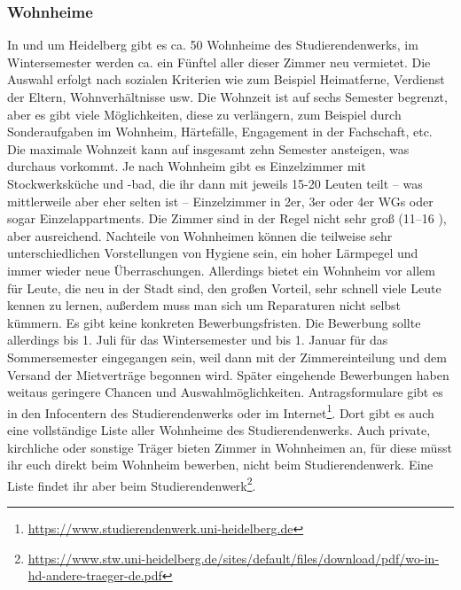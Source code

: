 \subsubsection{Wohnheime}


In und um Heidelberg gibt es ca. 50 Wohnheime des Studierendenwerks, im Wintersemester werden ca. ein Fünftel aller dieser Zimmer neu vermietet. Die Auswahl erfolgt nach sozialen Kriterien wie zum Beispiel Heimatferne, Verdienst der Eltern, Wohnverhältnisse usw. Die Wohnzeit ist auf sechs Semester begrenzt, aber es gibt viele Möglichkeiten, diese zu verlängern, zum Beispiel durch Sonderaufgaben im Wohnheim, Härtefälle, Engagement in der Fachschaft, etc. Die maximale Wohnzeit kann auf insgesamt zehn Semester ansteigen, was durchaus vorkommt. Je nach Wohnheim gibt es Einzelzimmer mit Stockwerksküche und -bad, die ihr dann mit jeweils 15-20 Leuten teilt -- was mittlerweile aber eher selten ist -- Einzelzimmer in 2er, 3er oder 4er WGs oder sogar Einzelappartments. Die Zimmer sind in der Regel nicht sehr groß (11--16 \squaren\metre), aber ausreichend. Nachteile von Wohnheimen können die teilweise sehr unterschiedlichen Vorstellungen von Hygiene sein, ein hoher Lärmpegel und immer wieder neue Überraschungen. Allerdings bietet ein Wohnheim vor allem für Leute, die neu in der Stadt sind, den großen Vorteil, sehr schnell viele Leute kennen zu lernen, außerdem muss man sich um Reparaturen nicht selbst kümmern. Es gibt keine konkreten Bewerbungsfristen. Die Bewerbung sollte allerdings bis 1. Juli für das Wintersemester und bis 1. Januar für das Sommersemester eingegangen sein, weil dann mit der Zimmereinteilung und dem Versand der Mietverträge begonnen wird. Später eingehende Bewerbungen haben weitaus geringere Chancen und Auswahlmöglichkeiten. Antragsformulare gibt es in den Infocentern des Studierendenwerks oder im Internet\footnote{\url{https://www.studierendenwerk.uni-heidelberg.de}}. Dort gibt es auch eine vollständige Liste aller Wohnheime des Studierendenwerks. Auch private, kirchliche oder sonstige Träger bieten Zimmer in Wohnheimen an, für diese müsst ihr euch direkt beim Wohnheim bewerben, nicht beim Studierendenwerk. Eine Liste findet ihr aber beim Studierendenwerk\footnote{\url{https://www.stw.uni-heidelberg.de/sites/default/files/download/pdf/wo-in-hd-andere-traeger-de.pdf}}.
